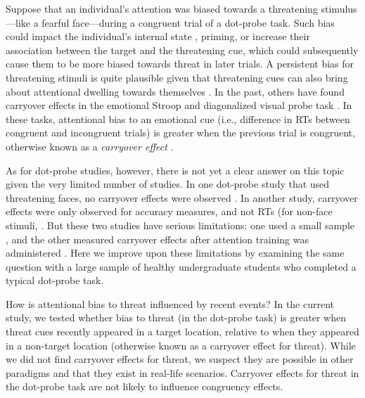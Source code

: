 \documentclass[issue,twocolumn,empirical, authordate,10pt]{jote-new-article}
\begin{document}
Suppose that an individual's attention was biased towards a threatening stimulus—like a fearful face—during a congruent trial of a dot-probe task. Such bias could impact the individual's internal state \parencite{Panksepp2011}, priming, or increase their association between the target and the threatening cue, which could subsequently cause them to be more biased towards threat in later trials. A persistent bias for threatening stimuli is quite plausible given that threatening cues can also bring about attentional dwelling towards themselves \parencite{Carlson2014, Fox2001}. In the past, others have found carryover effects in the emotional Stroop \parencite{Cane2009, Clarke2015, Waters2005, Wilson2007} and diagonalized visual probe task \parencite{Gladwin2019, Gladwin2020, Gladwin2019a}. In these tasks, attentional bias to an emotional cue (i.e., difference in RTs between congruent and incongruent trials) is greater when the previous trial is congruent, otherwise known as a \emph{carryover effect } \parencite{Gladwin2019}.



As for dot-probe studies, however, there is not yet a clear answer on this topic given the very limited number of studies. In one dot-probe study that used threatening faces, no carryover effects were observed \parencite{Hill2016}. In another study, carryover effects were only observed for accuracy measures, and not RTs (for non-face stimuli, \parencite{Gladwin2017}. But these two studies have serious limitations: one used a small sample \parencite{Gladwin2017}, and the other measured carryover effects after attention training was administered \parencite{Hill2016}. Here we improve upon these limitations by examining the same question with a large sample of healthy undergraduate students who completed a typical dot-probe task.
\begin{takeHomeMessage}

How is attentional bias to threat influenced by recent events? In the current study, we tested whether bias to threat (in the dot-probe task) is greater when threat cues recently appeared in a target location, relative to when they appeared in a non-target location (otherwise known as a carryover effect for threat). While we did not find carryover effects for threat, we suspect they are possible in other paradigms and that they exist in real-life scenarios. Carryover effects for threat in the dot-probe task are not likely to influence congruency effects.


\end{takeHomeMessage}
\end{document}
